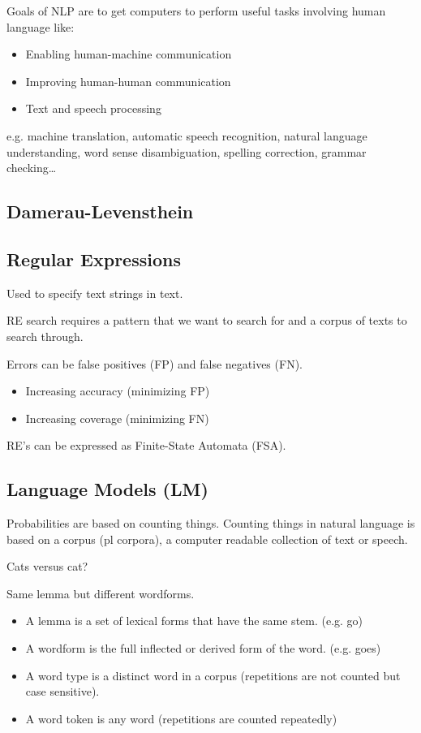 Goals of NLP are to get computers to perform useful tasks involving human language like:
\begin{itemize}
  \item Enabling human-machine communication
  \item Improving human-human communication
  \item Text and speech processing
\end{itemize}

e.g. machine translation, automatic speech recognition, natural language understanding, word sense disambiguation, spelling correction, grammar checking…


\subsection{Damerau-Levensthein}


\subsection*{Regular Expressions}

Used to specify text strings in text.

RE search requires a pattern that we want to search for and a corpus of texts to search through.

Errors can be false positives (FP) and false negatives (FN).

\begin{itemize}
  \item Increasing accuracy (minimizing FP)
  \item Increasing coverage (minimizing FN)
\end{itemize}

RE's can be expressed as Finite-State Automata (FSA).


\subsection*{Language Models (LM)}

Probabilities are based on counting things. Counting things in natural language is based on a corpus (pl corpora), a computer readable collection of text or speech.

Cats versus cat?

Same lemma but different wordforms.

\begin{itemize}
  \item A lemma is a set of lexical forms that have the same stem. (e.g. go)
  \item A wordform is the full inflected or derived form of the word. (e.g. goes)
  \item A word type is a distinct word in a corpus (repetitions are not counted but case sensitive).
  \item A word token is any word (repetitions are counted repeatedly)
\end{itemize}

